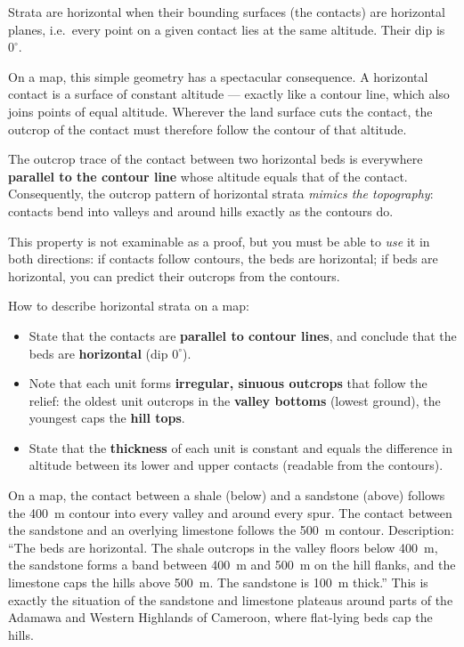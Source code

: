 \documentclass[11pt]{article}
\newcommand{\cle}[1]{{\popxbold\color{popdark}#1}}
\newcounter{popsec}
\newcounter{popsub}
\newcommand{\courssub}[1]{%
  \stepcounter{popsub}%
  \par\vspace{9pt}\noindent{\popxbold\fontsize{11.5}{13}\selectfont\color{popink}{\color{poporange}\thepopsec.\thepopsub}\hspace{6pt}#1}\par\nopagebreak\vspace{4pt}
}
\begin{document}
\courssub{Describing Horizontal Strata}

\begin{definition}
Strata are \cle{horizontal} when their bounding surfaces (the \cle{contacts}) are horizontal planes, i.e.\ every point on a given contact lies at the same altitude. Their dip is $0^\circ$.
\end{definition}

On a map, this simple geometry has a spectacular consequence. A horizontal contact is a surface of constant altitude — exactly like a contour line, which also joins points of equal altitude. Wherever the land surface cuts the contact, the outcrop of the contact must therefore follow the contour of that altitude.

\begin{propriete}
The outcrop trace of the contact between two horizontal beds is everywhere \textbf{parallel to the contour line} whose altitude equals that of the contact. Consequently, the outcrop pattern of horizontal strata \emph{mimics the topography}: contacts bend into valleys and around hills exactly as the contours do.
\end{propriete}

This property is not examinable as a proof, but you must be able to \emph{use} it in both directions: if contacts follow contours, the beds are horizontal; if beds are horizontal, you can predict their outcrops from the contours.

How to describe horizontal strata on a map:
\begin{itemize}
\item State that the contacts are \textbf{parallel to contour lines}, and conclude that the beds are \textbf{horizontal} (dip $0^\circ$).
\item Note that each unit forms \textbf{irregular, sinuous outcrops} that follow the relief: the oldest unit outcrops in the \textbf{valley bottoms} (lowest ground), the youngest caps the \textbf{hill tops}.
\item State that the \textbf{thickness} of each unit is constant and equals the difference in altitude between its lower and upper contacts (readable from the contours).
\end{itemize}

\begin{exemplebox}
On a map, the contact between a shale (below) and a sandstone (above) follows the \SI{400}{m} contour into every valley and around every spur. The contact between the sandstone and an overlying limestone follows the \SI{500}{m} contour. Description: ``The beds are horizontal. The shale outcrops in the valley floors below \SI{400}{m}, the sandstone forms a band between \SI{400}{m} and \SI{500}{m} on the hill flanks, and the limestone caps the hills above \SI{500}{m}. The sandstone is \SI{100}{m} thick.'' This is exactly the situation of the sandstone and limestone plateaus around parts of the Adamawa and Western Highlands of Cameroon, where flat-lying beds cap the hills.
\end{exemplebox}
\end{document}
